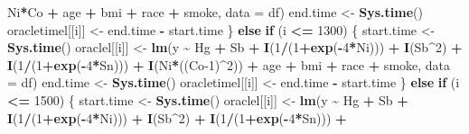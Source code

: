 \documentclass[12pt, twoside]{amherstthesis}
\newenvironment{Shaded}{\begin{snugshade}}{\end{snugshade}}
\newcommand{\AttributeTok}[1]{\textcolor[rgb]{0.13,0.29,0.53}{#1}}
\newcommand{\ControlFlowTok}[1]{\textcolor[rgb]{0.13,0.29,0.53}{\textbf{#1}}}
\newcommand{\DecValTok}[1]{\textcolor[rgb]{0.00,0.00,0.81}{#1}}
\newcommand{\FunctionTok}[1]{\textcolor[rgb]{0.13,0.29,0.53}{\textbf{#1}}}
\newcommand{\NormalTok}[1]{#1}
\newcommand{\OtherTok}[1]{\textcolor[rgb]{0.56,0.35,0.01}{#1}}
\newcommand{\SpecialCharTok}[1]{\textcolor[rgb]{0.81,0.36,0.00}{\textbf{#1}}}
\begin{document}
\begin{Shaded}
\begin{Highlighting}[]
\NormalTok{                           Ni}\SpecialCharTok{*}\NormalTok{Co }\SpecialCharTok{+} 
\NormalTok{                           age }\SpecialCharTok{+}\NormalTok{ bmi }\SpecialCharTok{+}\NormalTok{ race }\SpecialCharTok{+}\NormalTok{ smoke, }\AttributeTok{data =}\NormalTok{ df)}
\NormalTok{      end.time }\OtherTok{\textless{}{-}} \FunctionTok{Sys.time}\NormalTok{()}
\NormalTok{      oracletimel[[i]] }\OtherTok{\textless{}{-}}\NormalTok{ end.time }\SpecialCharTok{{-}}\NormalTok{ start.time}
\NormalTok{    \} }\ControlFlowTok{else} \ControlFlowTok{if}\NormalTok{ (i }\SpecialCharTok{\textless{}=} \DecValTok{1300}\NormalTok{) \{}
\NormalTok{      start.time }\OtherTok{\textless{}{-}} \FunctionTok{Sys.time}\NormalTok{()}
\NormalTok{      oraclel[[i]] }\OtherTok{\textless{}{-}} \FunctionTok{lm}\NormalTok{(y }\SpecialCharTok{\textasciitilde{}}\NormalTok{ Hg }\SpecialCharTok{+}\NormalTok{ Sb }\SpecialCharTok{+}
                           \FunctionTok{I}\NormalTok{(}\DecValTok{1}\SpecialCharTok{/}\NormalTok{(}\DecValTok{1}\SpecialCharTok{+}\FunctionTok{exp}\NormalTok{(}\SpecialCharTok{{-}}\DecValTok{4}\SpecialCharTok{*}\NormalTok{Ni))) }\SpecialCharTok{+} \FunctionTok{I}\NormalTok{(Sb}\SpecialCharTok{\^{}}\DecValTok{2}\NormalTok{) }\SpecialCharTok{+} \FunctionTok{I}\NormalTok{(}\DecValTok{1}\SpecialCharTok{/}\NormalTok{(}\DecValTok{1}\SpecialCharTok{+}\FunctionTok{exp}\NormalTok{(}\SpecialCharTok{{-}}\DecValTok{4}\SpecialCharTok{*}\NormalTok{Sn))) }\SpecialCharTok{+}
                           \FunctionTok{I}\NormalTok{(Ni}\SpecialCharTok{*}\NormalTok{((Co}\DecValTok{{-}1}\NormalTok{)}\SpecialCharTok{\^{}}\DecValTok{2}\NormalTok{)) }\SpecialCharTok{+} 
\NormalTok{                           age }\SpecialCharTok{+}\NormalTok{ bmi }\SpecialCharTok{+}\NormalTok{ race }\SpecialCharTok{+}\NormalTok{ smoke, }\AttributeTok{data =}\NormalTok{ df)}
\NormalTok{      end.time }\OtherTok{\textless{}{-}} \FunctionTok{Sys.time}\NormalTok{()}
\NormalTok{      oracletimel[[i]] }\OtherTok{\textless{}{-}}\NormalTok{ end.time }\SpecialCharTok{{-}}\NormalTok{ start.time}
\NormalTok{    \} }\ControlFlowTok{else} \ControlFlowTok{if}\NormalTok{ (i }\SpecialCharTok{\textless{}=} \DecValTok{1500}\NormalTok{) \{}
\NormalTok{      start.time }\OtherTok{\textless{}{-}} \FunctionTok{Sys.time}\NormalTok{()}
\NormalTok{      oraclel[[i]] }\OtherTok{\textless{}{-}} \FunctionTok{lm}\NormalTok{(y }\SpecialCharTok{\textasciitilde{}}\NormalTok{ Hg }\SpecialCharTok{+}\NormalTok{ Sb }\SpecialCharTok{+}
                           \FunctionTok{I}\NormalTok{(}\DecValTok{1}\SpecialCharTok{/}\NormalTok{(}\DecValTok{1}\SpecialCharTok{+}\FunctionTok{exp}\NormalTok{(}\SpecialCharTok{{-}}\DecValTok{4}\SpecialCharTok{*}\NormalTok{Ni))) }\SpecialCharTok{+} \FunctionTok{I}\NormalTok{(Sb}\SpecialCharTok{\^{}}\DecValTok{2}\NormalTok{) }\SpecialCharTok{+} \FunctionTok{I}\NormalTok{(}\DecValTok{1}\SpecialCharTok{/}\NormalTok{(}\DecValTok{1}\SpecialCharTok{+}\FunctionTok{exp}\NormalTok{(}\SpecialCharTok{{-}}\DecValTok{4}\SpecialCharTok{*}\NormalTok{Sn))) }\SpecialCharTok{+}

\end{Highlighting}
\end{Shaded}
\end{document}
